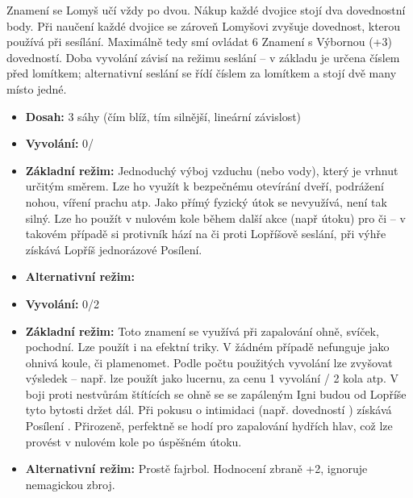 \documentclass[../main.tex]{subfiles}
\begin{document}
Znamení se Lomyš učí vždy po dvou. Nákup každé dvojice stojí dva dovednostní body. Při naučení každé dvojice se zároveň Lomyšovi zvyšuje dovednost, kterou používá při sesílání. Maximálně tedy smí ovládat 6 Znamení s Výbornou (+3) dovedností. Doba vyvolání závisí na režimu seslání – v základu je určena číslem před lomítkem; alternativní seslání se řídí číslem za lomítkem a stojí dvě many místo jedné.

\begin{specialita}[Aard]
\begin{itemize}
	\item \textbf{Dosah:} 3 sáhy (čím blíž, tím silnější, lineární závislost)
	\item \textbf{Vyvolání:} 0/
	\item \textbf{Základní režim:} Jednoduchý výboj vzduchu (nebo vody), který je vrhnut určitým směrem. Lze ho využít k bezpečnému otevírání dveří, podrážení nohou, víření prachu atp. Jako přímý fyzický útok se nevyužívá, není tak silný. Lze ho použít v nulovém kole během další akce (např útoku) pro  či  – v takovém případě si protivník hází na  či  proti Lopříšově seslání, při výhře získává Lopříš jednorázové Posílení.
	\item \textbf{Alternativní režim:}
\end{itemize}
\end{specialita}

\begin{specialita}[Igni]
\begin{itemize}
	\item \textbf{Vyvolání:} 0/2
	\item \textbf{Základní režim:} Toto znamení se využívá při zapalování ohně, svíček, pochodní. Lze použít i na efektní triky. V žádném případě nefunguje jako ohnivá koule, či plamenomet. Podle počtu použitých vyvolání lze zvyšovat výsledek – např. lze použít jako lucernu, za cenu 1 vyvolání / 2 kola atp. V boji proti nestvůrám štítících se ohně se se zapáleným Igni budou od Lopříše tyto bytosti držet dál. Při pokusu o intimidaci (např. dovedností ) získává Posílení . Přirozeně, perfektně se hodí pro zapalování hydřích hlav, což lze provést v nulovém kole po úspěšném útoku.
	\item \textbf{Alternativní režim:} Prostě fajrbol. Hodnocení zbraně +2, ignoruje nemagickou zbroj.
\end{itemize}
\end{specialita}
\end{document}
